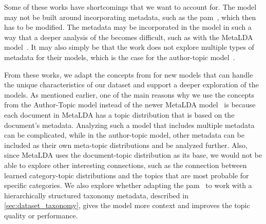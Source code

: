 Some of these works have shortcomings that we want to account for.
The model may not be built around incorporating metadata, such as the \gls{pam}~\cite{li2006pachinko}, which then has to be modified.
The metadata may be incorporated in the model in such a way that a deeper analysis of the becomes difficult, such as with the MetaLDA model~\cite{MetaLDA2017}.
It may also simply be that the work does not explore multiple types of metadata for their models, which is the case for the author-topic model~\cite{author_topic_2012}.

From these works, we adapt the concepts from \citet{author_topic_2012} for new models that can handle the unique characteristics of our dataset and support a deeper exploration of the models.
As mentioned earlier, one of the main reasons why we use the concepts from the Author-Topic model instead of the newer MetaLDA model~\cite{MetaLDA2017} is because each document in MetaLDA has a topic distribution that is based on the document's metadata.
Analyzing such a model that includes multiple metadata can be complicated, while in the author-topic model, other metadata can be included as their own meta-topic distributions and be analyzed further.
Also, since MetaLDA uses the document-topic distribution as its base, we would not be able to explore other interesting connections, such as the connection between learned category-topic distributions and the topics that are most probable for specific categories.
We also explore whether adapting the \gls{pam}~\cite{li2006pachinko} to work with a hierarchically structured taxonomy metadata, described in \autoref{sec:dataset_taxonomy}, gives the model more context and improves the topic quality or performance.
